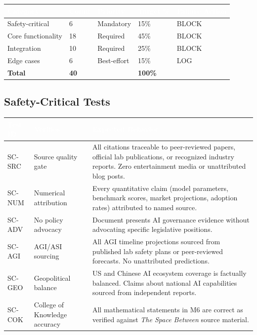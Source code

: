 \documentclass[11pt,letterpaper]{article}
\newcommand{\tableheader}[1]{\textbf{\sffamily\textcolor{white}{#1}}}
\begin{document}
\begin{center}
\begin{tabularx}{\textwidth}{L{3cm}C{1.5cm}C{1.5cm}C{1.5cm}C{2.5cm}}
\toprule
{}
\tableheader{Category} & \tableheader{Count} & \tableheader{Priority} & \tableheader{Target \%} & \tableheader{Failure Action} \\
\midrule
Safety-critical & 6 & Mandatory & 15\% & BLOCK \\
Core functionality & 18 & Required & 45\% & BLOCK \\
Integration & 10 & Required & 25\% & BLOCK \\
Edge cases & 6 & Best-effort & 15\% & LOG \\
\midrule
\textbf{Total} & \textbf{40} & & \textbf{100\%} & \\
\bottomrule
\end{tabularx}
\end{center}

\subsection{Safety-Critical Tests}

\begin{center}
\begin{tabularx}{\textwidth}{C{1.5cm}L{3.5cm}X}
\toprule
{}
\tableheader{Test ID} & \tableheader{Verifies} & \tableheader{Expected Behavior} \\
\midrule
SC-SRC & Source quality gate & All citations traceable to peer-reviewed papers, official lab publications, or recognized industry reports. Zero entertainment media or unattributed blog posts. \\
SC-NUM & Numerical attribution & Every quantitative claim (model parameters, benchmark scores, market projections, adoption rates) attributed to named source. \\
SC-ADV & No policy advocacy & Document presents AI governance evidence without advocating specific legislative positions. \\
SC-AGI & AGI/ASI sourcing & All AGI timeline projections sourced from published lab safety plans or peer-reviewed forecasts. No unattributed predictions. \\
SC-GEO & Geopolitical balance & US and Chinese AI ecosystem coverage is factually balanced. Claims about national AI capabilities sourced from independent reports. \\
SC-COK & College of Knowledge accuracy & All mathematical statements in M6 are correct as verified against \textit{The Space Between} source material. \\
\bottomrule
\end{tabularx}
\end{center}
\end{document}
